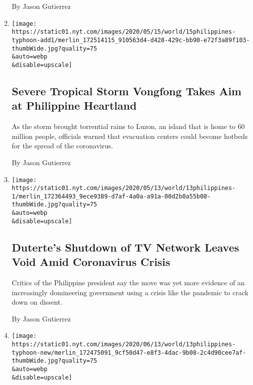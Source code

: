 \begin{enumerate}
  By Jason Gutierrez
\item
  \href{/2020/05/15/world/asia/typhoon-vongfong-philippines-luzon.html}{}

  \texttt{[image: https://static01.nyt.com/images/2020/05/15/world/15philippines-typhoon-add1/merlin\_172514115\_910563d4-d428-429c-bb90-e72f3a89f103-thumbWide.jpg?quality=75\\\&auto=webp\\\&disable=upscale]}

  \hypertarget{severe-tropical-storm-vongfong-takes-aim-at-philippine-heartland}{%
  \subsection{Severe Tropical Storm Vongfong Takes Aim at Philippine
  Heartland}\label{severe-tropical-storm-vongfong-takes-aim-at-philippine-heartland}}

  As the storm brought torrential rains to Luzon, an island that is home
  to 60 million people, officials warned that evacuation centers could
  become hotbeds for the spread of the coronavirus.

  By Jason Gutierrez
\item
  \href{/2020/05/14/world/asia/duterte-philippines-tv-network-ABS-CBN.html}{}

  \texttt{[image: https://static01.nyt.com/images/2020/05/13/world/13philippines-1/merlin\_172364493\_9ece9389-d7af-4a0a-a91a-00d2b0a55b08-thumbWide.jpg?quality=75\\\&auto=webp\\\&disable=upscale]}

  \hypertarget{dutertes-shutdown-of-tv-network-leaves-void-amid-coronavirus-crisis}{%
  \subsection{Duterte's Shutdown of TV Network Leaves Void Amid
  Coronavirus
  Crisis}\label{dutertes-shutdown-of-tv-network-leaves-void-amid-coronavirus-crisis}}

  Critics of the Philippine president say the move was yet more evidence
  of an increasingly domineering government using a crisis like the
  pandemic to crack down on dissent.

  By Jason Gutierrez
\item
  \href{/2020/05/13/world/asia/philippines-typhoon-vongfong.html}{}

  \texttt{[image: https://static01.nyt.com/images/2020/06/13/world/13philippines-typhoon-new/merlin\_172475091\_9cf50d47-e8f3-4dac-9b08-2c4d90cee7af-thumbWide.jpg?quality=75\\\&auto=webp\\\&disable=upscale]}


\end{enumerate}
